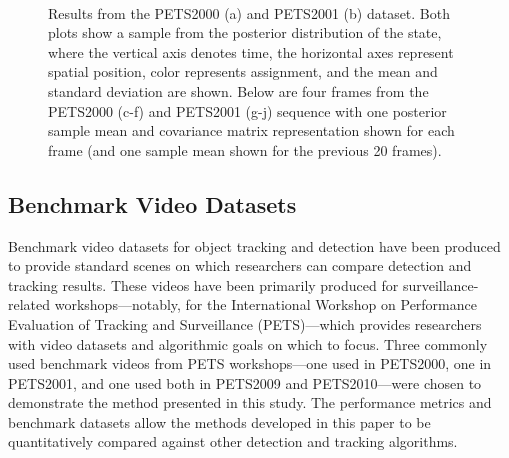 \documentclass[twocolumn, final]{svjour3}
\begin{document}
\begin{figure}[!]
   \\
  \caption{Results from the PETS2000 (a) and PETS2001 (b) dataset. Both plots show a sample from the posterior distribution of the state, where the vertical axis denotes time, the horizontal axes represent spatial position, color represents assignment, and the mean and standard deviation are shown. Below are four frames from the PETS2000 (c-f) and PETS2001 (g-j) sequence with one posterior sample mean and covariance matrix representation shown for each frame (and one sample mean shown for the previous 20 frames).}
  \label{fig:pets2001_overlay}
\end{figure}


\subsection{Benchmark Video Datasets}
\label{sec:benchmarkvideodatasets}

Benchmark video datasets for object tracking and detection have been produced to provide standard scenes on which researchers can compare detection and tracking results. These videos have been primarily produced for surveillance-related workshops---notably, for the International Workshop on Performance Evaluation of Tracking and Surveillance (PETS)---which provides researchers with video datasets and algorithmic goals on which to focus. Three commonly used benchmark videos from PETS workshops---one used in PETS2000, one in PETS2001, and one used both in PETS2009 and PETS2010---were chosen to demonstrate the method presented in this study. The performance metrics and benchmark datasets allow the methods developed in this paper to be quantitatively compared against other detection and tracking algorithms.
\end{document}

